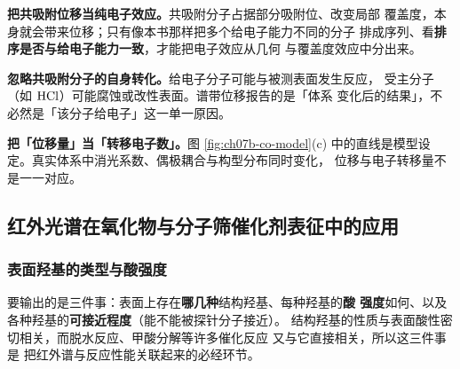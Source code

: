 \begin{pitfall}
\textbf{把共吸附位移当纯电子效应。}共吸附分子占据部分吸附位、改变局部
覆盖度，本身就会带来位移；只有像本书那样把多个给电子能力不同的分子
排成序列、看\textbf{排序是否与给电子能力一致}，才能把电子效应从几何
与覆盖度效应中分出来。

\textbf{忽略共吸附分子的自身转化。}给电子分子可能与被测表面发生反应，
受主分子（如 $\ce{HCl}$）可能腐蚀或改性表面。谱带位移报告的是「体系
变化后的结果」，不必然是「该分子给电子」这一单一原因。

\textbf{把「位移量」当「转移电子数」。}图 \ref{fig:ch07b-co-model}(c)
中的直线是模型设定。真实体系中消光系数、偶极耦合与构型分布同时变化，
位移与电子转移量不是一一对应。
\end{pitfall}

\subsection{红外光谱在氧化物与分子筛催化剂表征中的应用}
\label{sec:ch07b-oxide}

\subsubsection{表面羟基的类型与酸强度}

\begin{probout}
要输出的是三件事：表面上存在\textbf{哪几种}结构羟基、每种羟基的\textbf{酸
强度}如何、以及各种羟基的\textbf{可接近程度}（能不能被探针分子接近）。
结构羟基的性质与表面酸性密切相关，而脱水反应、甲酸分解等许多催化反应
又与它直接相关，所以这三件事是
把红外谱与反应性能关联起来的必经环节。
\end{probout}

